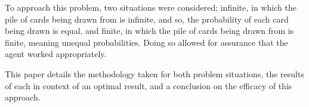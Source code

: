 To approach this problem, two situations were considered; infinite, in which the pile of cards being drawn from is infinite, and so, the probability of each card being drawn is equal, and finite, in which the pile of cards being drawn from is finite, meaning unequal probabilities. Doing so allowed for assurance that the agent worked appropriately. 

This paper details the methodology taken for both problem situations, the results of each in context of an optimal result, and a conclusion on the efficacy of this approach.

